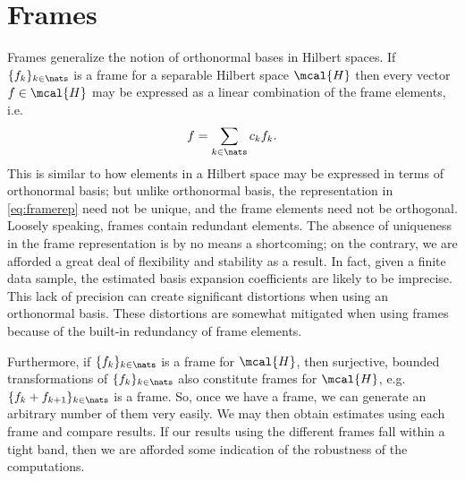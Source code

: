 \documentclass[a4paper, 12pt,preprint]{article}
\newcommand{\sumn}{\ensuremath{\sum_{k \in \nats}}\xspace}
\newcommand{\hs}{\ensuremath{\mcal{H}}\xspace}
\begin{document}
\section{ Frames}\label{sec:gabor} 
Frames generalize the notion of orthonormal bases in  Hilbert spaces. If $\{f_k\}_{k \in \nats}$ is a frame for a separable Hilbert space \hs then every vector $f \in \hs$ may be expressed as a linear combination of the frame elements, i.e.
\begin{align}
  f = \sumn c_k f_k.
  \label{eq:framerep}
\end{align}
This is similar to how elements in a Hilbert space may be expressed in terms of orthonormal basis; but unlike orthonormal basis, the representation in \eqref{eq:framerep} need not be unique, and the frame elements need not be orthogonal. Loosely speaking, frames contain redundant elements. The absence of uniqueness in the frame representation is by no means a shortcoming; on the contrary, we are afforded a great deal of flexibility and stability as a result. In fact, given a finite data sample, the estimated basis expansion coefficients are likely to be imprecise. This lack of precision can create significant distortions when using an orthonormal basis. These distortions are somewhat mitigated when using frames because of the built-in redundancy of frame elements. 



Furthermore, if $\{f_k\}_{k \in \nats}$ is a frame for \hs, then surjective, bounded  transformations of $\{f_k\}_{k \in \nats}$  also constitute frames for \hs, e.g. $\{f_k + f_{k+1}\}_{k \in \nats}$ is a frame. So, once we have a frame, we can generate an arbitrary number of them very easily. We may then obtain estimates using each frame and compare results. If our results using the different frames fall within a tight band, then we are afforded some indication of the robustness of the computations.   


\end{document}
